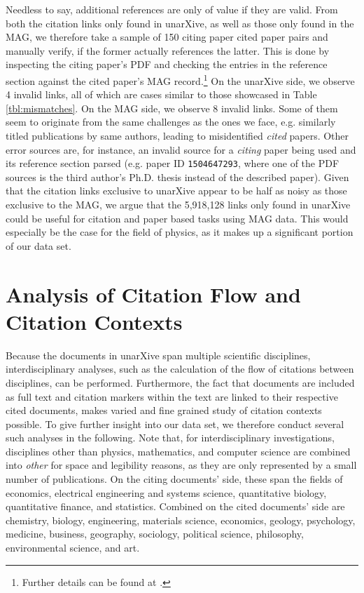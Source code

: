 Needless to say, additional references are only of value if they are valid. From both the citation links only found in unarXive, as well as those only found in the MAG, we therefore take a sample of 150 citing paper cited paper pairs and manually verify, if the former actually references the latter. This is done by inspecting the citing paper's PDF and checking the entries in the reference section against the cited paper's MAG record.\footnote{Further details can be found at .} On the unarXive side, we observe 4 invalid links, all of which are cases similar to those showcased in Table \ref{tbl:mismatches}. On the MAG side, we observe 8 invalid links. Some of them seem to originate from the same challenges as the ones we face, e.g. similarly titled publications by same authors, leading to misidentified \emph{cited} papers. Other error sources are, for instance, an invalid source for a \emph{citing} paper being used and its reference section parsed (e.g. paper ID \texttt{1504647293}, where one of the PDF sources is the third author's Ph.D. thesis instead of the described paper). Given that the citation links exclusive to unarXive appear to be half as noisy as those exclusive to the  MAG, we argue that the 5,918,128 links only found in unarXive could be useful for citation and paper based tasks using MAG data. This would especially be the case for the field of physics, as it makes up a significant portion of our data set.

\section{Analysis of Citation Flow and Citation Contexts}
\label{sec:analysis}

Because the documents in unarXive span multiple scientific disciplines, interdisciplinary analyses, such as the calculation of the flow of citations between disciplines, can be performed. Furthermore, the fact that documents are included as full text and citation markers within the text are linked to their respective cited documents, makes varied and fine grained study of citation contexts possible. To give further insight into our data set, we therefore conduct several such analyses in the following. Note that, for interdisciplinary investigations, disciplines other than physics, mathematics, and computer science are combined into \emph{other} for space and legibility reasons, as they are only represented by a small number of publications. On the citing documents' side, these span the fields of economics, electrical engineering and systems science, quantitative biology, quantitative finance, and statistics. Combined on the cited documents' side are chemistry, biology, engineering, materials science, economics, geology, psychology, medicine, business, geography, sociology, political science, philosophy, environmental science, and art.

